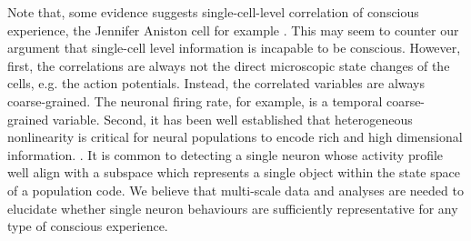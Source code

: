\documentclass[utf8]{article}
\begin{document}
    
          Note that, some evidence suggests single-cell-level correlation of conscious experience, the Jennifer Aniston cell for example \citep{Quiroga2005Jun, Quiroga2012Jul}. This may seem to counter our argument that single-cell level information is incapable to be conscious. However, first, the correlations are always not the direct microscopic state changes of the cells, e.g. the action potentials. Instead, the correlated variables are always coarse-grained. The neuronal firing rate, for example, is a temporal coarse-grained variable. Second, it has been well established that heterogeneous nonlinearity is critical for neural populations to encode rich and high dimensional information. \citep{Chelaru2008, Rigotti2010Oct, Shamir2004Jun}. It is common to detecting a single neuron whose activity profile well align with a subspace which represents a single object within the state space of a population code. We believe that multi-scale data and analyses are needed to elucidate whether single neuron behaviours are sufficiently representative for any type of conscious experience. 

        
        
\end{document}

